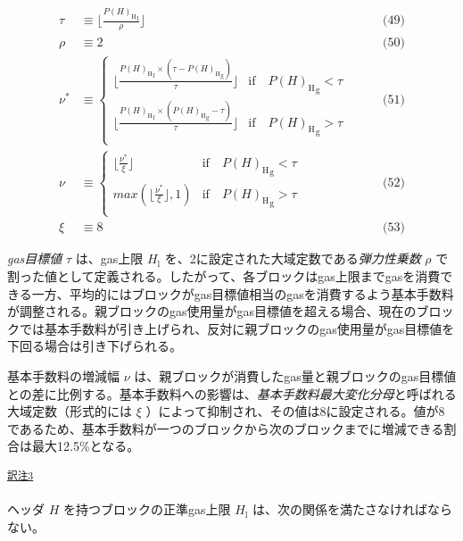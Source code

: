 \documentclass[
]{ltjsarticle}
\begin{document}
\[\begin{aligned}
\tau &\equiv \lfloor\frac{{P(H)_{\mathrm{H}}}_{\mathrm{l}}}{\rho} \rfloor & \qquad \text{(49)} \\
\rho &\equiv 2 & \qquad \text{(50)} \\
\nu^{*} &\equiv \begin{cases}
      \lfloor \frac{{P(H)_{\mathrm{H}}}_{\mathrm{f}} \times ({\tau - P(H)_{\mathrm{H}}}_{\mathrm{g}})}{\tau} \rfloor &  \text{if} \quad {P(H)_{\mathrm{H}}}_{\mathrm{g}} < \tau \\
      \lfloor \frac{{P(H)_{\mathrm{H}}}_{\mathrm{f}} \times ({P(H)_{\mathrm{H}}}_{\mathrm{g}} - \tau)}{\tau} \rfloor &  \text{if} \quad {P(H)_{\mathrm{H}}}_{\mathrm{g}} > \tau \\
  \end{cases} & \qquad \text{(51)} \\
\nu &\equiv \begin{cases}
    \lfloor \frac{\nu^*}{\xi} \rfloor &  \text{if} \quad {P(H)_{\mathrm{H}}}_{\mathrm{g}} < \tau \\
    max(\lfloor \frac{\nu^*}{\xi} \rfloor, 1) &  \text{if} \quad {P(H)_{\mathrm{H}}}_{\mathrm{g}} > \tau \\
  \end{cases} & \qquad \text{(52)} \\
\xi &\equiv 8 & \qquad \text{(53)}
\end{aligned}\]

\emph{gas目標値} \(\tau\) は、gas上限 \(H_{\mathrm{l}}\)
を、2に設定された大域定数である\emph{弾力性乗数} \(\rho\)
で割った値として定義される。したがって、各ブロックはgas上限までgasを消費できる一方、平均的にはブロックがgas目標値相当のgasを消費するよう基本手数料が調整される。親ブロックのgas使用量がgas目標値を超える場合、現在のブロックでは基本手数料が引き上げられ、反対に親ブロックのgas使用量がgas目標値を下回る場合は引き下げられる。

基本手数料の増減幅 \(\nu\)
は、親ブロックが消費したgas量と親ブロックのgas目標値との差に比例する。基本手数料への影響は、\emph{基本手数料最大変化分母}と呼ばれる大域定数（形式的には
\(\xi\)
）によって抑制され、その値は8に設定される。値が8であるため、基本手数料が一つのブロックから次のブロックまでに増減できる割合は最大12.5\%となる。

\protect\hypertarget{tnref-3}{}{}\textsuperscript{\protect\hyperlink{tn-3}{訳注3}}

\hypertarget{block_gas_limit_H__l}{}

ヘッダ \(H\) を持つブロックの正準gas上限 \(H_{\mathrm{l}}\)
は、次の関係を満たさなければならない。
\end{document}
